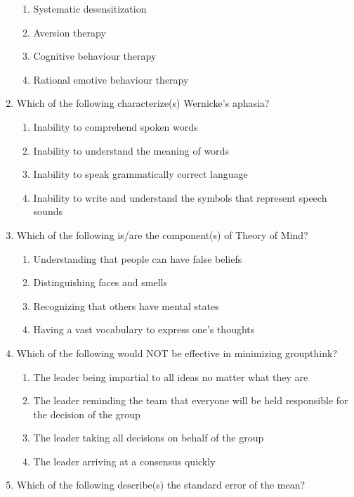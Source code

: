 \documentclass[12pt]{article}
\theoremstyle{remark}
\begin{document}
\begin{enumerate}
\begin{enumerate}
    \item Systematic desensitization
    \item Aversion therapy
    \item Cognitive behaviour therapy
    \item Rational emotive behaviour therapy
\end{enumerate}
\hfill{}
\item Which of the following characterize(s) Wernicke’s aphasia?
\begin{enumerate}
    \item Inability to comprehend spoken words
    \item Inability to understand the meaning of words
    \item Inability to speak grammatically correct language
    \item Inability to write and understand the symbols that represent speech sounds
\end{enumerate}
\hfill{}
\item Which of the following is/are the component(s) of Theory of Mind?
\begin{enumerate}
    \item Understanding that people can have false beliefs
    \item Distinguishing faces and smells
    \item Recognizing that others have mental states
    \item Having a vast vocabulary to express one’s thoughts
\end{enumerate}
\hfill{}
\item Which of the following would NOT be effective in minimizing groupthink?
\begin{enumerate}
    \item The leader being impartial to all ideas no matter what they are
    \item The leader reminding the team that everyone will be held responsible for the decision of the group
    \item The leader taking all decisions on behalf of the group
    \item The leader arriving at a consensus quickly
\end{enumerate}
\hfill{}
\item Which of the following describe(s) the standard error of the mean?
\begin{enumerate}

\end{enumerate}
\end{enumerate}
\end{document}

